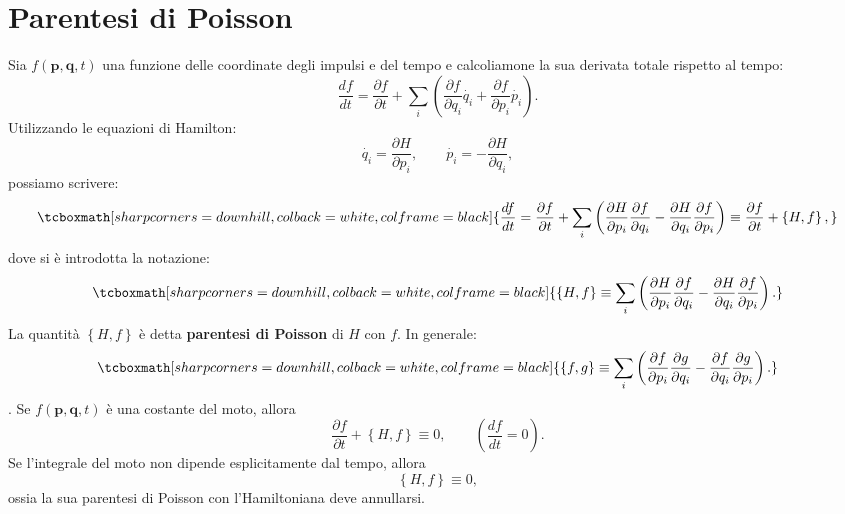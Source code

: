 \documentclass[a4paper,12pt,oneside]{book}
\begin{document}
\section[Parentesi di Poisson]{Parentesi di Poisson}
Sia $f(\mathbf{p},\mathbf{q},t)$ una funzione delle coordinate degli impulsi e del tempo e calcoliamone la sua derivata totale rispetto al tempo:
	\begin{equation}
		\frac{df}{dt}= \frac{\partial f}{\partial t} + \sum_i \left( \frac{\partial f}{\partial q_i} \dot {q_i} + \frac{\partial f}{\partial p_i} \dot {p_i} \right).
	\end{equation}
Utilizzando le equazioni di Hamilton:
	\begin{equation}
		\dot{q_i}=\frac{\partial H}{\partial p_i} , \qquad \dot{p_i}=-\frac{\partial H}{\partial q_i} ,
	\end{equation}
possiamo scrivere:
	\begin{equation}
		\tcboxmath[sharp corners=downhill, colback=white, colframe=black]{
			\frac{df}{dt}=	\frac{\partial f}{\partial t} + \sum_i \left( \frac{\partial H}{\partial p_i}\frac{\partial f}{\partial q_i}-\frac{\partial H}{\partial q_i}\frac{\partial f}{\partial p_i}\right) \equiv \frac{\partial f}{\partial t} + \left\lbrace H,f \right\rbrace ,
				}
	\end{equation}
dove si \`e introdotta la notazione:
	\begin{equation}
		\tcboxmath[sharp corners=downhill, colback=white, colframe=black]{
			\left\lbrace H,f \right\rbrace \equiv \sum_i \left(\frac{\partial H}{\partial p_i}\frac{\partial f}{\partial q_i}-\frac{\partial H}{\partial q_i}\frac{\partial f}{\partial p_i}\right)  .
			}
	\end{equation}
La quantit\`a $\left\lbrace H,f \right\rbrace$ è detta \textbf{parentesi di Poisson} di $H$ con $f$. In generale:
	\begin{equation}
		\tcboxmath[sharp corners=downhill, colback=white, colframe=black]{
			\left\lbrace f,g \right\rbrace \equiv \sum_i \left(\frac{\partial f}{\partial p_i}\frac{\partial g}{\partial q_i}-\frac{\partial f}{\partial q_i}\frac{\partial g}{\partial p_i}\right)  .
			}
	\end{equation}.
Se $f(\mathbf{p},\mathbf{q},t)$ \`e una costante del moto, allora
	\begin{equation}
		\frac{\partial f}{\partial t}+\left\lbrace H,f \right\rbrace   \equiv 0 , \qquad
\left( \frac{df}{dt}=0 \right) .
	\end{equation}
Se l'integrale del moto non dipende esplicitamente dal tempo, allora
\begin{equation}
\left\lbrace H,f \right\rbrace  \equiv 0 ,
\end{equation}
ossia la sua parentesi di Poisson con l'Hamiltoniana deve annullarsi.\\
\end{document}
